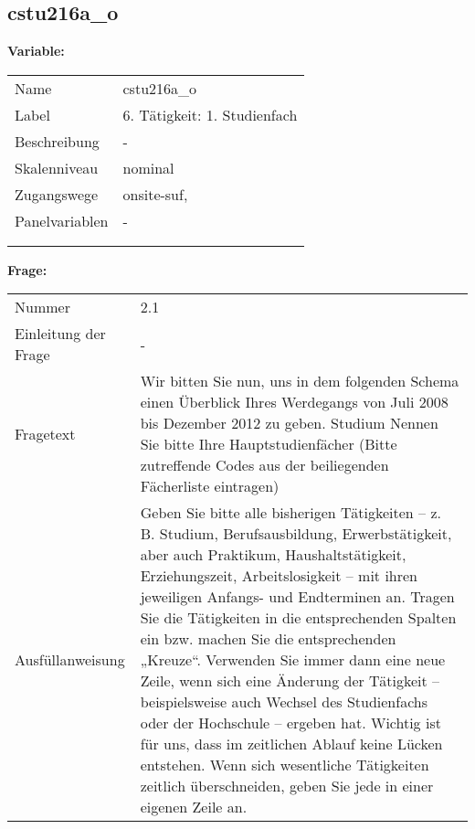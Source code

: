 	
	
	\subsection{cstu216a\_o}
	\label{subSection:cstu216a_o}

	\noindent\textbf{Variable:}\\
		\begin{tabular}{lL{11.3cm}}
			\label{tableVariable:cstu216a_o}
			Name & cstu216a\_o \\
			Label & 6. Tätigkeit: 1. Studienfach \\
			Beschreibung & - \\
			Skalenniveau & nominal \\
			Zugangswege &
				onsite-suf,
 \\
			Panelvariablen & -
			 \\
			 \\
 \\
		\end{tabular}

		\vspace*{1 cm}
		\noindent\textbf{Frage:}\\
		\begin{tabular}{lL{11.3cm}}
			\label{tableQuestion:cstu216a_o}
			Nummer & 2.1 \\
			Einleitung der Frage & - \\
			Fragetext & Wir bitten Sie nun, uns in dem folgenden Schema einen Überblick Ihres Werdegangs von Juli 2008 bis Dezember 2012 zu geben.
Studium
Nennen Sie bitte Ihre Hauptstudienfächer
(Bitte zutreffende Codes aus der beiliegenden Fächerliste eintragen) \\
			Ausfüllanweisung & Geben Sie bitte alle bisherigen Tätigkeiten – z. B. Studium, Berufsausbildung, Erwerbstätigkeit, aber auch Praktikum, Haushaltstätigkeit,
Erziehungszeit, Arbeitslosigkeit – mit ihren jeweiligen Anfangs- und Endterminen an. Tragen Sie die Tätigkeiten in die entsprechenden Spalten ein bzw. machen Sie die entsprechenden „Kreuze“. Verwenden Sie immer dann eine neue Zeile, wenn sich eine Änderung der Tätigkeit – beispielsweise auch Wechsel des Studienfachs oder der Hochschule – ergeben hat. Wichtig ist für uns, dass im zeitlichen Ablauf keine Lücken entstehen. Wenn sich wesentliche Tätigkeiten zeitlich überschneiden, geben Sie jede in einer eigenen Zeile an. \\
		\end{tabular}





